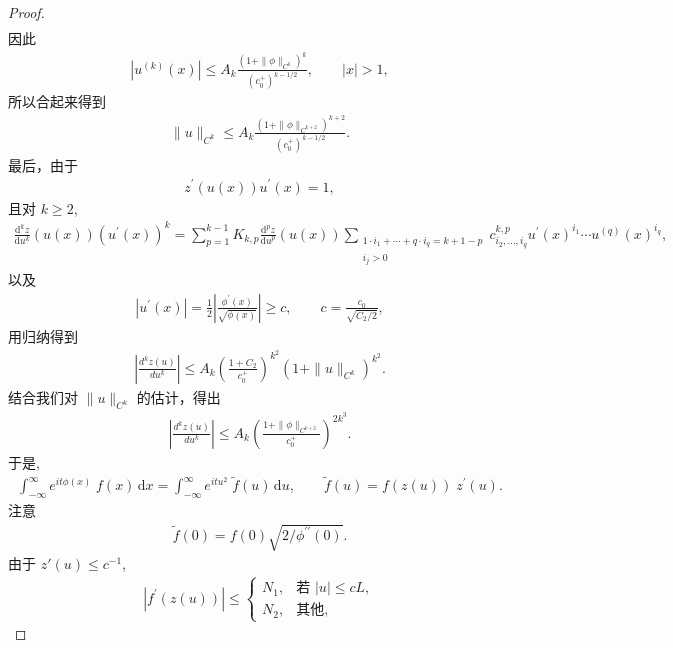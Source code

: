 \begin{proof}
\begin{align*}
\end{align*}
因此
\begin{align*}
  |u^{(k)}(x)|\leq A_{k}\frac{(1+\|\phi\|_{C^{k}})^{k}}{(c_{0}^{+})^{k-1/2}},\qquad |x|>1,
\end{align*}
所以合起来得到
\begin{align*}
  \|u\|_{C^{k}}\leq A_{k}\frac{(1+\|\phi\|_{C^{k+2}})^{k+2}}{(c_{0}^{+})^{k-1/2}}.
\end{align*}
最后，由于
\begin{align*}
  z^{\prime}(u(x))u^{\prime}(x)=1,
\end{align*}
且对 $k \geq 2$,
\begin{align*}
  \frac{\mathrm{d}^{k}z}{\mathrm{d}u^{k}}(u(x))(u^{\prime}(x))^{k}
  =\sum_{p=1}^{k-1}K_{k,p}\frac{\mathrm{d}^{p}z}{\mathrm{d}u^{p}}(u(x))
  \sum_{\substack{1\cdot i_{1}+\cdots+q\cdot i_{q}=k+1-p\\ i_{j}>0}}
  c_{i_{2},\ldots,i_{q}}^{k,p}u^{\prime}(x)^{i_{1}}\cdots u^{(q)}(x)^{i_{q}},
\end{align*}
以及
\begin{align*}
  |u^{\prime}(x)|=\frac{1}{2}\left|\frac{\phi^{\prime}(x)}{\sqrt{\phi(x)}}\right|\geq c,
  \qquad c=\frac{c_{0}}{\sqrt{C_{2}/2}},
\end{align*}
用归纳得到
\begin{align*}
  \left|\frac{d^{k}z(u)}{d u^{k}}\right|
  \leq A_{k}\left(\frac{1+C_{2}}{c_{0}^{+}}\right)^{k^{2}}\left(1+\|u\|_{C^{k}}\right)^{k^{2}}.
\end{align*}
结合我们对 $\|u\|_{C^k}$ 的估计，得出
\begin{align*}
  \left|\frac{d^{k}z(u)}{d u^{k}}\right|
  \leq A_{k}\left(\frac{1+\|\phi\|_{C^{k+2}}}{c_{0}^{+}}\right)^{2k^{3}}.
\end{align*}
于是,
\begin{align*}
  \int_{-\infty}^{\infty}e^{i t\phi(x)}\;f(x)\,\mathrm{d}x
  =\int_{-\infty}^{\infty}e^{i t u^{2}}\;\tilde{f}(u)\,\mathrm{d}u,
  \qquad \tilde{f}(u)=f(z(u))\;z^{\prime}(u).
\end{align*}
注意
\begin{align*}
  \tilde{f}(0)=f(0)\sqrt{2/\phi^{\prime\prime}(0)}.
\end{align*}
由于 $z'(u) \leq c^{-1}$,
\begin{align*}
  \left|f^{\prime}(z(u))\right|\leq\begin{cases}
    N_{1}, & \text{若 } \left|u\right|\leq cL,\\
    N_{2}, & \text{其他},
  \end{cases}

\end{align*}
\end{proof}
